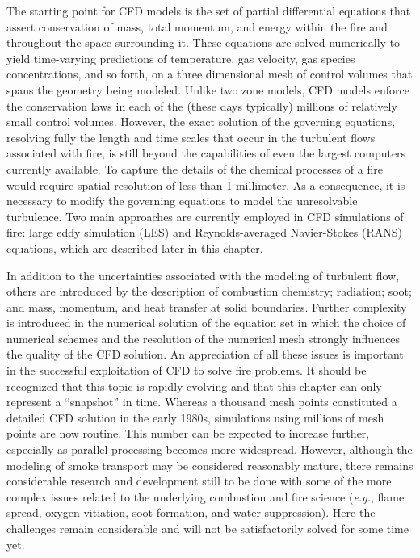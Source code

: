 \documentclass[graybox]{svmult}
\begin{document}
The starting point for CFD models is the set of partial differential equations that assert conservation of mass, total momentum, and energy within the fire and throughout the space surrounding it. These equations are solved numerically to yield time-varying predictions of temperature,  gas  velocity,  gas species concentrations, and so forth, on a three dimensional mesh of control volumes that spans the geometry being modeled. Unlike two zone models, CFD models enforce the conservation laws in each of the (these days typically) millions of relatively small control volumes. However, the exact solution of the governing equations, resolving fully the length and time scales that occur in the turbulent flows associated with fire, is still beyond the capabilities of even the largest computers currently available. To capture the details of the chemical processes of a fire would require spatial resolution of less than 1 millimeter. As a consequence, it is necessary to modify the governing equations to model the unresolvable turbulence. Two main approaches are currently employed in CFD simulations of fire: large eddy simulation (LES) and Reynolds-averaged Navier-Stokes (RANS) equations, which are described later in this chapter.

In addition to the uncertainties associated with the modeling of turbulent flow, others are introduced by the description of combustion chemistry; radiation; soot; and mass, momentum, and heat transfer at solid boundaries. Further complexity is introduced in the numerical solution of the equation set in which the choice of numerical schemes and the resolution of the numerical mesh strongly influences the quality of the CFD solution. An appreciation of all these issues is important in the successful exploitation of CFD to solve fire problems.
It should be recognized that this topic is rapidly evolving and that this chapter can only represent a ``snapshot'' in time. Whereas a thousand mesh points constituted a detailed CFD solution in the early 1980s, simulations using millions of mesh points are now routine. This number can be expected to increase further, especially as parallel processing becomes more widespread. However, although the modeling of smoke transport may be considered reasonably mature, there remains considerable research and development still to be done with some of the more complex issues related to the underlying combustion and fire science ({\em e.g.}, flame spread, oxygen vitiation, soot formation, and water suppression). Here the challenges remain considerable and will not be satisfactorily solved for some time yet.
\end{document}
